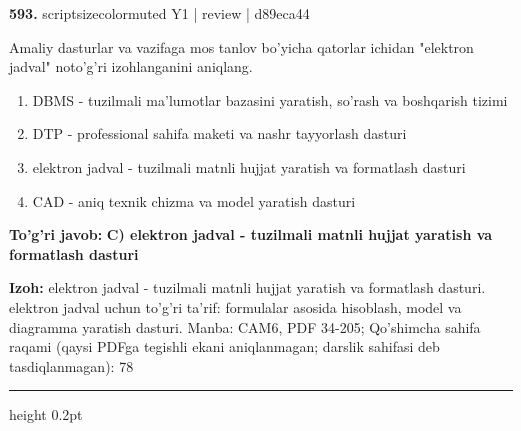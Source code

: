 \documentclass[10pt,a4paper]{article}
\begin{document}
{\bfseries\sffamily\color{ink} 593.} {scriptsizecolor{muted} Y1 | review | d89eca44}
\par
Amaliy dasturlar va vazifaga mos tanlov bo'yicha qatorlar ichidan "elektron jadval" noto'g'ri izohlanganini aniqlang.
\begin{enumerate}[label=\Alph*),leftmargin=9mm]
\item DBMS - tuzilmali ma'lumotlar bazasini yaratish, so'rash va boshqarish tizimi
\item DTP - professional sahifa maketi va nashr tayyorlash dasturi
\item elektron jadval - tuzilmali matnli hujjat yaratish va formatlash dasturi
\item CAD - aniq texnik chizma va model yaratish dasturi
\end{enumerate}
\begin{tcolorbox}[enhanced,breakable,colback=teal!4,colframe=teal!60!black,boxrule=0.45pt,arc=1.2mm,left=2.7mm,right=2.7mm,top=1.8mm,bottom=1.8mm,before skip=2mm,after skip=2mm]
{\bfseries\sffamily\color{teal}To'g'ri javob:} \textbf{C) elektron jadval - tuzilmali matnli hujjat yaratish va formatlash dasturi}
\par\smallskip
{\bfseries Izoh:} elektron jadval - tuzilmali matnli hujjat yaratish va formatlash dasturi. elektron jadval uchun to'g'ri ta'rif: formulalar asosida hisoblash, model va diagramma yaratish dasturi. Manba: CAM6, PDF 34-205; Qo'shimcha sahifa raqami (qaysi PDFga tegishli ekani aniqlanmagan; darslik sahifasi deb tasdiqlanmagan): 78
\end{tcolorbox}
\vspace{2mm}\hrule height 0.2pt\vspace{3mm}
\end{document}
